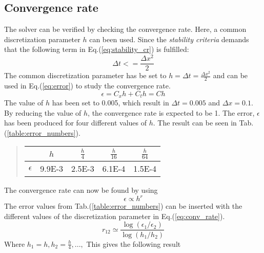 \documentclass[%
twoside,                 %
final,                   %
chapterprefix=true,      %
open=right               %
10pt]{book}
\begin{document}
\subsection{Convergence rate}
The solver can be verified by checking the convergence rate. Here, a common discretization parameter $h$ can been used. Since the \emph{stability criteria} demands that the following term in Eq.(\ref{eq:stability_cr}) is fulfilled: 
\begin{equation} \label{eq:stability_cr}
 \Delta t <= \frac{\Delta x^2}{2}
\end{equation}
The common discretization parameter has be set to $h=\Delta t = \frac{\Delta x^2}{2}$ and can be used in Eq.(\ref{eq:error}) to study the convergence rate.
\begin{equation} \label{eq:error}
    \epsilon = C_x h + C_t h = C h
\end{equation}
The value of $h$ has been set to 0.005, which result in $\Delta t = 0.005$ and $\Delta x=0.1$. By reducing the value of $h$, the convergence rate is expected to be 1. The error, $\epsilon$ has been produced for four different values of $h$. The result can be seen in Tab.(\ref{table:error_numbers}).  
\label{table:error_numbers}

\begin{quote}
\begin{tabular}{ccccc}
\hline
\multicolumn{1}{c}{  } & \multicolumn{1}{c}{ $h$ } & \multicolumn{1}{c}{ $\frac{h}{4}$ } & \multicolumn{1}{c}{ $\frac{h}{16}$ } & \multicolumn{1}{c}{ $\frac{h}{64}$ } \\
\hline
$\epsilon$ & 9.9E-3 & 2.5E-3        & 6.1E-4         & 1.5E-4         \\
\hline
\end{tabular}
\end{quote}

\noindent
The convergence rate can now be found by using
\begin{equation}
    \epsilon \propto h^r
\end{equation}
The error values from Tab.(\ref{table:error_numbers}) can be inserted with the different values of the discretization parameter in Eq.(\ref{eq:conv_rate}). 
\begin{equation} \label{eq:conv_rate}
 r_{12} \simeq \frac{\log(\epsilon_1/\epsilon_2)}{\log(h_1/h_2)}
\end{equation}
Where $h_1 = h,h_2 = \frac{h}{4},...,$ This gives the following result
\end{document}
